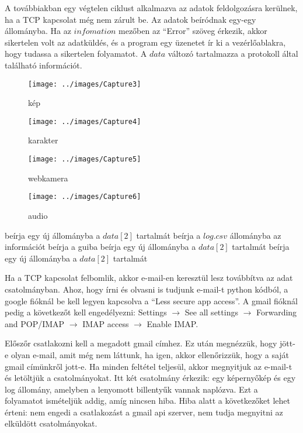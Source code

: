 \documentclass[a4paper, 11pt]{article}
\begin{document}
A továbbiakban egy végtelen ciklust alkalmazva az adatok feldolgozásra kerülnek, ha a TCP kapcsolat még nem zárult be. Az adatok beíródnak egy-egy állományba. Ha az $infomation$ mezőben az ``Error'' szöveg érkezik, akkor sikertelen volt az adatküldés, és a program egy üzenetet ír ki a vezérlőablakra, hogy tudassa a sikertelen folyamatot. A $data$ változó tartalmazza a protokoll által található információt.
\begin{figure}[H]
\centering
\texttt{[image: ../images/Capture3]}
\caption{kép}
\label{fig:imgprocess}
\end{figure}
\begin{figure}[H]
\centering
\texttt{[image: ../images/Capture4]}
\caption{karakter}
\label{fig:charprocess}
\end{figure}
\begin{figure}[H]
\centering
\texttt{[image: ../images/Capture5]}
\caption{webkamera}
\label{fig:webcamprocess}
\end{figure}
\begin{figure}[H]
\centering
\texttt{[image: ../images/Capture6]}
\caption{audio}
\label{fig:audioprocess}
\end{figure}

\begin{algorithmic}[H]
		\State beírja egy új állományba a $data[2]$ tartalmát
	\EndIf
{}
	\State beírja a $log.csv$ állományba az információt
		\State beírja a guiba
	\EndIf
{}
		\State beírja egy új állományba a $data[2]$ tartalmát
	\EndIf
{}
		\State beírja egy új állományba a $data[2]$ tartalmát
	\EndIf
\EndIf
\end{algorithmic}

Ha a TCP kapcsolat felbomlik, akkor e-mail-en keresztül lesz továbbítva az adat csatolmányban. Ahoz, hogy írni és olvasni is tudjunk e-mail-t python kódból, a google fióknál be kell legyen kapcsolva a ``Less secure app access''. A gmail fióknál pedig a következőt kell engedélyezni: Settings $\rightarrow$ See all settings $\rightarrow$ Forwarding and POP/IMAP $\rightarrow$ IMAP access $\rightarrow$ Enable IMAP.

Előszőr csatlakozni kell a megadott gmail címhez. Ez után megnézzük, hogy jött-e olyan e-mail, amit még nem láttunk, ha igen, akkor ellenőrizzük, hogy a saját gmail címünkről jott-e. Ha minden feltétel teljesül, akkor megnyitjuk az e-mail-t és letöltjük a csatolmányokat. Itt két csatolmány érkezik: egy képernyőkép és egy log állomány, amelyben a lenyomott billentyűk vannak naplózva. Ezt a folyamatot ismételjük addig, amíg nincsen hiba. Hiba alatt a következőket lehet érteni: nem engedi a csatlakozást a gmail api szerver, nem tudja megnyitni az elküldött csatolmányokat.
\end{document}
